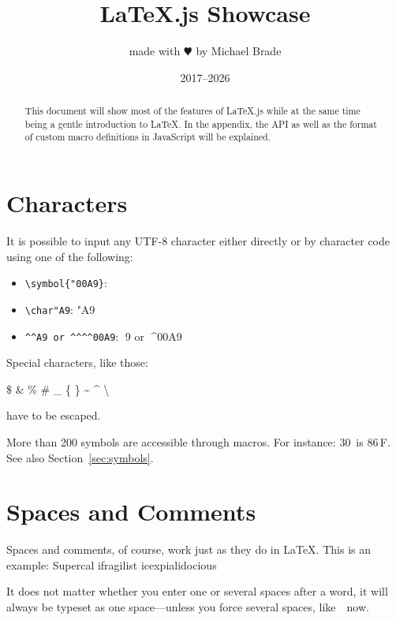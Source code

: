 \documentclass{article}
\title{\LaTeX.js Showcase}
\author{made with $\varheartsuit$ by Michael Brade}
\date{2017--2026}
\begin{document}
\maketitle


\begin{abstract}
This document will show most of the features of \LaTeX.js while at the same time being a gentle introduction to \LaTeX.
In the appendix, the API as well as the format of custom macro definitions in JavaScript will be explained.
\end{abstract}


\section{Characters}

It is possible to input any UTF-8 character either directly or by character code
using one of the following:

\begin{itemize}
    \item \texttt{\textbackslash symbol\{"00A9\}}: 
    \item \verb|\char"A9|: \char"A9
    \item \verb|^^A9 or ^^^^00A9|: ^^A9 or ^^^^00A9
\end{itemize}

\bigskip

\noindent
Special characters, like those:
\begin{center}
\$ \& \% \# \_ \{ \} \~{} \^{} \textbackslash %
\end{center}
%
have to be escaped.

More than 200 symbols are accessible through macros. For instance: 30\,\textcelsius{} is
86\,\textdegree{}F. See also Section~\ref{sec:symbols}.



\section{Spaces and Comments}

Spaces and comments, of course, work just as they do in \LaTeX.
This is an            %
example: Supercal%
                ifragilist%
    icexpialidocious

It does not matter whether you enter one or several     spaces after a word, it
will always be typeset as one space---unless you force several spaces, like\ \ now.
\end{document}
